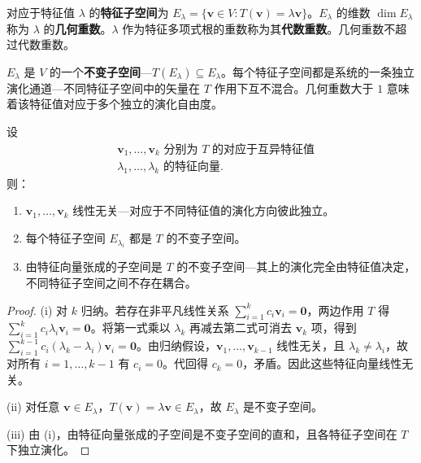 \begin{definition}[特征子空间与几何重数]\label{def:eigenspace}
对应于特征值 $\lambda$ 的\textbf{特征子空间}为 $E_\lambda = \{\mathbf{v} \in V : T(\mathbf{v}) = \lambda \mathbf{v}\}$。$E_\lambda$ 的维数 $\dim E_\lambda$ 称为 $\lambda$ 的\textbf{几何重数}。$\lambda$ 作为特征多项式根的重数称为其\textbf{代数重数}。几何重数不超过代数重数。

$E_\lambda$ 是 $V$ 的一个\textbf{不变子空间}---$T(E_\lambda) \subseteq E_\lambda$。每个特征子空间都是系统的一条独立演化通道---不同特征子空间中的矢量在 $T$ 作用下互不混合。几何重数大于 $1$ 意味着该特征值对应于多个独立的演化自由度。
\end{definition}

\begin{theorem}[特征向量与不变子空间]\label{thm:eigenvector_invariant_subspace}
设
\[
\begin{aligned}
&\mathbf{v}_1, \dots, \mathbf{v}_k \text{ 分别为 } T \text{ 的对应于互异特征值} \\
&\lambda_1, \dots, \lambda_k \text{ 的特征向量}.
\end{aligned}
\]
则：
\begin{enumerate}[label=(\roman*)]
    \item $\mathbf{v}_1, \dots, \mathbf{v}_k$ 线性无关---对应于不同特征值的演化方向彼此独立。
    \item 每个特征子空间 $E_{\lambda_i}$ 都是 $T$ 的不变子空间。
    \item 由特征向量张成的子空间是 $T$ 的不变子空间---其上的演化完全由特征值决定，不同特征子空间之间不存在耦合。
\end{enumerate}
\end{theorem}

\begin{proof}
(i) 对 $k$ 归纳。若存在非平凡线性关系 $\sum_{i=1}^k c_i \mathbf{v}_i = \mathbf{0}$，两边作用 $T$ 得 $\sum_{i=1}^k c_i \lambda_i \mathbf{v}_i = \mathbf{0}$。将第一式乘以 $\lambda_k$ 再减去第二式可消去 $\mathbf{v}_k$ 项，得到 $\sum_{i=1}^{k-1} c_i (\lambda_k - \lambda_i) \mathbf{v}_i = \mathbf{0}$。由归纳假设，$\mathbf{v}_1, \dots, \mathbf{v}_{k-1}$ 线性无关，且 $\lambda_k \neq \lambda_i$，故对所有 $i=1,\dots,k-1$ 有 $c_i = 0$。代回得 $c_k = 0$，矛盾。因此这些特征向量线性无关。

(ii) 对任意 $\mathbf{v} \in E_\lambda$，$T(\mathbf{v}) = \lambda \mathbf{v} \in E_\lambda$，故 $E_\lambda$ 是不变子空间。

(iii) 由 (i)，由特征向量张成的子空间是不变子空间的直和，且各特征子空间在 $T$ 下独立演化。
\end{proof}

